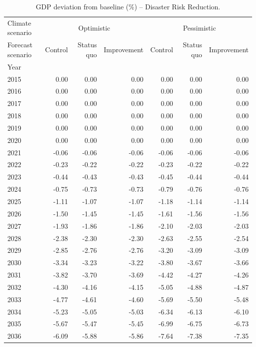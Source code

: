 \begin{table}
\caption{GDP deviation from baseline (\%) -- Disaster Risk Reduction.}
\label{tab:results_DRR_baseline_rel}
\centering
\begin{tabular}{lrrrrrr}
\toprule
Climate scenario & \multicolumn{3}{c}{Optimistic} & \multicolumn{3}{c}{Pessimistic} \\
Forecast scenario & Control & Status quo & Improvement & Control & Status quo & Improvement \\
Year &  &  &  &  &  &  \\
\midrule
2015 & 0.00 & 0.00 & 0.00 & 0.00 & 0.00 & 0.00 \\
2016 & 0.00 & 0.00 & 0.00 & 0.00 & 0.00 & 0.00 \\
2017 & 0.00 & 0.00 & 0.00 & 0.00 & 0.00 & 0.00 \\
2018 & 0.00 & 0.00 & 0.00 & 0.00 & 0.00 & 0.00 \\
2019 & 0.00 & 0.00 & 0.00 & 0.00 & 0.00 & 0.00 \\
2020 & 0.00 & 0.00 & 0.00 & 0.00 & 0.00 & 0.00 \\
2021 & -0.06 & -0.06 & -0.06 & -0.06 & -0.06 & -0.06 \\
2022 & -0.23 & -0.22 & -0.22 & -0.23 & -0.22 & -0.22 \\
2023 & -0.44 & -0.43 & -0.43 & -0.45 & -0.44 & -0.44 \\
2024 & -0.75 & -0.73 & -0.73 & -0.79 & -0.76 & -0.76 \\
2025 & -1.11 & -1.07 & -1.07 & -1.18 & -1.14 & -1.14 \\
2026 & -1.50 & -1.45 & -1.45 & -1.61 & -1.56 & -1.56 \\
2027 & -1.93 & -1.86 & -1.86 & -2.10 & -2.03 & -2.03 \\
2028 & -2.38 & -2.30 & -2.30 & -2.63 & -2.55 & -2.54 \\
2029 & -2.85 & -2.76 & -2.76 & -3.20 & -3.09 & -3.09 \\
2030 & -3.34 & -3.23 & -3.22 & -3.80 & -3.67 & -3.66 \\
2031 & -3.82 & -3.70 & -3.69 & -4.42 & -4.27 & -4.26 \\
2032 & -4.30 & -4.16 & -4.15 & -5.05 & -4.88 & -4.87 \\
2033 & -4.77 & -4.61 & -4.60 & -5.69 & -5.50 & -5.48 \\
2034 & -5.23 & -5.05 & -5.03 & -6.34 & -6.13 & -6.10 \\
2035 & -5.67 & -5.47 & -5.45 & -6.99 & -6.75 & -6.73 \\
2036 & -6.09 & -5.88 & -5.86 & -7.64 & -7.38 & -7.35 \\

\end{tabular}
\end{table}
